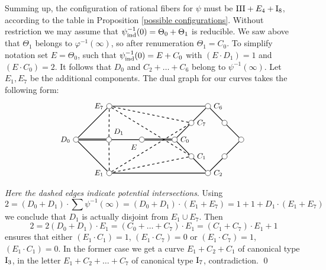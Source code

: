 \documentclass[oneside, 12pt]{amsart}
\theoremstyle{definition}
\theoremstyle{remark}
\newcommand{\I}{\text{\rm I}}
\newcommand{\III}{\text{\rm III}}
\newcommand{\ind}{\text{\rm ind}}
\newcommand{\inv}{{-1}}
\begin{document}
Summing up, the configuration of rational fibers for $\psi$
must be $\III+E_4+\I_8$, according to the   table in Proposition \ref{possible configurations}.
Without restriction we may assume that $\psi^{-1}_\ind(0)=\Theta_0+\Theta_1$ is reducible.
We saw above that $\Theta_1$ belongs to $\varphi^\inv(\infty)$, so after renumeration $\Theta_1=C_0$.
To simplify notation set $E=\Theta_0$, such that
$\psi^\inv_\ind(0)=E+C_0$   with $(E\cdot D_1)=1$ and $(E\cdot C_0)=2$. 
It follows that  $D_0$ and $C_2+\ldots+C_6$ belong  to $\psi^\inv(\infty)$. Let $E_1,E_7$ be the additional components.
The dual graph for our curves takes the following form:
\begin{equation*}
\begin{gathered}
\begin{tikzpicture}
[node distance=1cm, font=\small]
\tikzstyle{vertex}=[circle, draw, fill=white, inner sep=0mm, minimum size=1.5ex]
\node[vertex]	(C0)  	at (0,0)[label=right:{$C_0$}] 		{};
\node[vertex]	(C1)			[below right of=C0, label=right:{$C_1$}]	{};
\node[vertex]	(C2)			[below right of=C1, label=right:{$C_2$}]	{};
\node[vertex]	(C3)			[above right of=C2, label=right:{}]	{};
\node[vertex]	(C4)			[above right of=C3, label=right:{}]	{};
\node[vertex]	(C5)			[above left of=C4, label=right:{}]	{};
\node[vertex]	(C6)			[above left of=C5, label=right:{$C_6$}]	{};
\node[vertex]	(C7)			[below left of=C6, label=right:{$C_7$}]	{};
 
\node[vertex]   (E)             [left of=C0,  xshift=-0.4cm,  label=below left:{$E$}]	{};
\node[vertex]	(D1)			[left of=E,  xshift=-0.4cm,  label=above right:{$D_1$}]	{};
\node[vertex]	(D0)			[left of=D1,  xshift=-0.4cm, label=left:{$D_0$}]	{};

\node[vertex]   (E7)            [left of=C6,  xshift=-3.2cm,  label=left:{$E_7$}]	{};
\node[vertex]   (E1)            [left of=C2,  xshift=-3.2cm,  label=left:{$E_1$}]	{};

\draw[thick] (C0)--(C1)--(C2)--(C3)--(C4)--(C5)--(C6)--(C7)--(C0);
\draw[thick,double] (D0)--(D1);
\draw[thick,double] (E)--(C0);
\draw[thick] (E)--(D1);
\draw[thick] (C2)--(E1)--(D0)--(E7)--(C6);
\draw[thick,dashed] (C7)--(E7)--(C1);
\draw[thick,dashed] (C1)--(E1)--(C7);
\draw[thick,dashed] (E1)--(D1)--(E7);
\end{tikzpicture}
\end{gathered}
\end{equation*}
\emph{Here the dashed edges indicate potential intersections}.
Using
$$
2=(D_0+D_1) \cdot\sum \psi^\inv(\infty) = (D_0+D_1)\cdot(E_1+E_7) = 1+1 + D_1\cdot(E_1+E_7)
$$
we conclude that $D_1$ is actually disjoint from $E_1\cup E_7$. Then
$$
2=2(D_0+D_1)\cdot E_1 = (C_0+\ldots+C_7)\cdot E_1 = (C_1+C_7)\cdot E_1 +1
$$
ensures that either $(E_1\cdot C_1)=1$, $(E_1\cdot C_7)=0$ or $(E_1\cdot C_7)=1$, $(E_1\cdot C_1)=0$.
In the former case we get a curve    $E_1+C_2+C_1$ of canonical type $\I_3$, in the letter 
$E_1+C_2+\ldots+C_7$ of canonical type $\I_7$, contradiction.
\qed
\end{document}
